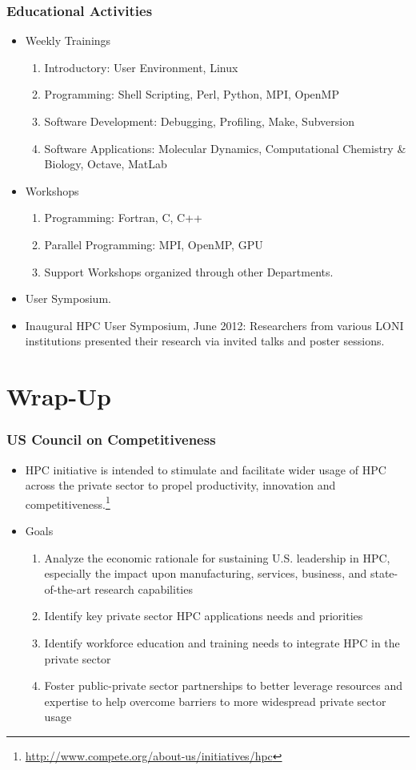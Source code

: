 \documentclass[slidestop,mathserif,compress,xcolor=svgnames,table]{beamer}
\newcommand*\vardiamond{\textcolor{tigerspurple}{%
  \ensuremath{\blacklozenge}}}
\begin{document}
\begin{frame}
  \frametitle{\small Educational Activities}
  \begin{itemize}
    \item Weekly Trainings
    \begin{enumerate}
      \item Introductory: User Environment, Linux
      \item Programming: Shell Scripting, Perl, Python, MPI, OpenMP
      \item Software Development: Debugging, Profiling, Make, Subversion
      \item Software Applications: Molecular Dynamics, Computational Chemistry \& Biology, Octave, MatLab
    \end{enumerate}
    \item Workshops
    \begin{enumerate}
      \item Programming: Fortran, C, C++
      \item Parallel Programming: MPI, OpenMP, GPU
      \item Support Workshops organized through other Departments.
    \end{enumerate}
    \item User Symposium.
    \item[$\vardiamond$] Inaugural HPC User Symposium, June 2012:  Researchers from various LONI institutions presented their research via invited talks and poster sessions. 
  \end{itemize}
\end{frame}

\section{Wrap-Up}
\begin{frame}
  \frametitle{\small US Council on Competitiveness}
  \begin{itemize}
    \item HPC initiative  is intended to stimulate and facilitate wider usage of HPC across the private sector to propel productivity, innovation and competitiveness.\let\thefootnote\relax\footnote{\tiny \url{http://www.compete.org/about-us/initiatives/hpc}}
    \item Goals
    \begin{enumerate}
      \item Analyze the economic rationale for sustaining U.S. leadership in HPC, especially the impact upon manufacturing, services, business, and state-of-the-art research capabilities
      \item Identify key private sector HPC applications needs and priorities
      \item Identify workforce education and training needs to integrate HPC in the private sector
      \item Foster public-private sector partnerships to better leverage resources and expertise to help overcome barriers to more widespread private sector usage
    \end{enumerate}
  \end{itemize}
\end{frame}
\end{document}
